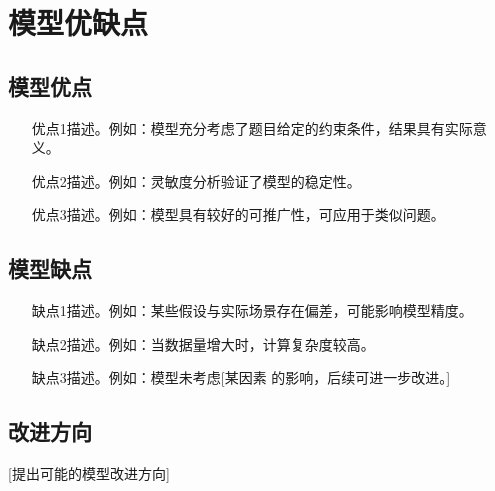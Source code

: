 
\section{模型优缺点}

\subsection{模型优点}

\begin{enumerate}
    \item [优点1描述。例如：模型充分考虑了题目给定的约束条件，结果具有实际意义。]
    \item [优点2描述。例如：灵敏度分析验证了模型的稳定性。]
    \item [优点3描述。例如：模型具有较好的可推广性，可应用于类似问题。]
\end{enumerate}

\subsection{模型缺点}

\begin{enumerate}
    \item [缺点1描述。例如：某些假设与实际场景存在偏差，可能影响模型精度。]
    \item [缺点2描述。例如：当数据量增大时，计算复杂度较高。]
    \item [缺点3描述。例如：模型未考虑[某因素]的影响，后续可进一步改进。]
\end{enumerate}

\subsection{改进方向}

[提出可能的模型改进方向]
